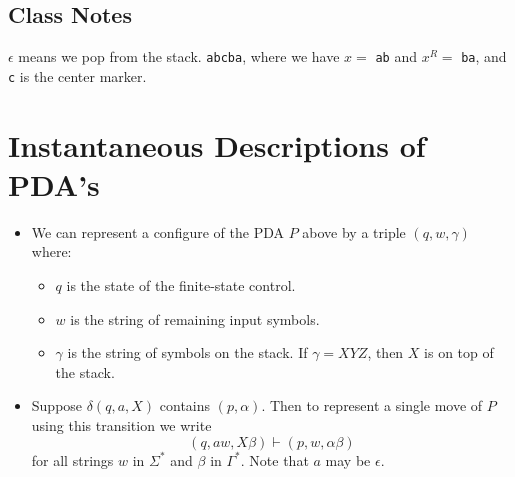 \documentclass[]{article}
\begin{document}
  \subsection*{Class Notes}
  $\epsilon$ means we pop from the stack. \texttt{abcba}, where we have $x = $ \texttt{ab} and $x^R = $ \texttt{ba}, and \texttt{c} is the center marker.

\section{Instantaneous Descriptions of PDA's}
  \begin{itemize}
    \item We can represent a configure of the PDA $P$ above by a triple $(q,w,
    \gamma)$ where:
      \begin{itemize}
        \item $q$ is the state of the finite-state control.
        \item $w$ is the string of remaining input symbols.
        \item $\gamma$ is the string of symbols on the stack. If $\gamma = XYZ$, 
        then $X$ is on top of the stack.
      \end{itemize}
    \item Suppose $\delta(q,a,X)$ contains $(p,\alpha)$. Then to represent a 
    single move of $P$ using this transition we write
      \[ (q,aw,X\beta) \vdash (p,w,\alpha\beta) \]
    for all strings $w$ in $\Sigma^*$ and $\beta$ in $\Gamma^*$. Note that $a$ 
    may be $\epsilon$.
  \end{itemize}
  
\end{document}
